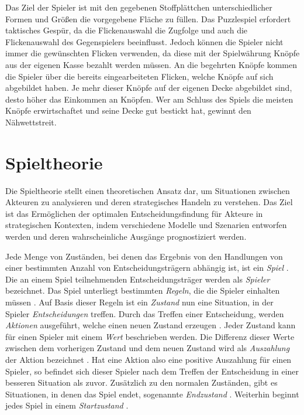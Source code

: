 Das Ziel der Spieler ist mit den gegebenen Stoffplättchen unterschiedlicher Formen und Größen die vorgegebene Fläche zu füllen. Das Puzzlespiel erfordert taktisches Gespür, da die Flickenauswahl die Zugfolge und auch die Flickenauswahl des Gegenspielers beeinflusst. Jedoch können die Spieler nicht immer die gewünschten Flicken verwenden, da diese mit der Spielwährung Knöpfe aus der eigenen Kasse bezahlt werden müssen. An die begehrten Knöpfe kommen die Spieler über die bereits eingearbeiteten Flicken, welche Knöpfe auf sich abgebildet haben. Je mehr dieser Knöpfe auf der eigenen Decke abgebildet sind, desto höher das Einkommen an Knöpfen. Wer am Schluss des Spiels die meisten Knöpfe erwirtschaftet und seine Decke gut bestickt hat, gewinnt den Nähwettstreit. \cite{SpielDesJahresPatchwork}

\vspace*{-10cm}
\pagebreak

\section{Spieltheorie}
\label{chapter:spieltheorie}

Die Spieltheorie stellt einen theoretischen Ansatz dar, um Situationen zwischen Akteuren zu analysieren und deren strategisches Handeln zu verstehen. Das Ziel ist das Ermöglichen der optimalen Entscheidungsfindung für Akteure in strategischen Kontexten, indem verschiedene Modelle und Szenarien entworfen werden und deren wahrscheinliche Ausgänge prognostiziert werden. \cite{2024.GameTheory}

Jede Menge von Zuständen, bei denen das Ergebnis von den Handlungen von einer bestimmten Anzahl von Entscheidungsträgern abhängig ist, ist ein \emph{Spiel} \cite{2024.GameTheory}. Die an einem Spiel teilnehmenden Entscheidungsträger werden als \emph{Spieler} bezeichnet. Das Spiel unterliegt bestimmten \emph{Regeln}, die die Spieler einhalten müssen \cite[S. 1]{2014.GameTheoryThroughExamples}. Auf Basis dieser Regeln ist ein \emph{Zustand} nun eine Situation, in der Spieler \emph{Entscheidungen} treffen. Durch das Treffen einer Entscheidung, werden \emph{Aktionen} ausgeführt, welche einen neuen Zustand erzeugen \cite[S. 1]{2014.GameTheoryThroughExamples}. Jeder Zustand kann für einen Spieler mit einem \emph{Wert} beschrieben werden. Die Differenz dieser Werte zwischen dem vorherigen Zustand und dem neuen Zustand wird als \emph{Auszahlung} der Aktion bezeichnet \cite{2024.GameTheory}. Hat eine Aktion also eine positive Auszahlung für einen Spieler, so befindet sich dieser Spieler nach dem Treffen der Entscheidung in einer besseren Situation als zuvor. Zusätzlich zu den normalen Zuständen, gibt es Situationen, in denen das Spiel endet, sogenannte \emph{Endzustand} \cite[S. 53]{2014.GameTheoryThroughExamples}. Weiterhin beginnt jedes Spiel in einem \emph{Startzustand} \cite[S. 53]{2014.GameTheoryThroughExamples}.

